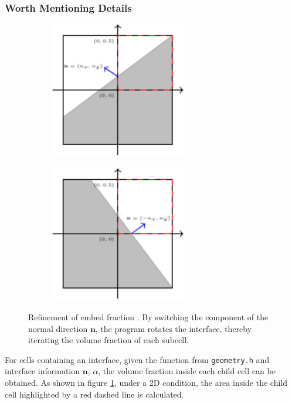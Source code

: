 \subsubsection{Worth Mentioning Details}
\begin{figure}[ht]
    \centering
    \begin{subfigure}[b]{0.45\textwidth}
        \centering
        \includegraphics[height=6cm]{./image/embed-tree-h/fraction_refine2D1.pdf}
        \subcaption{}
        \label{fig:embed-tree-2Drefine1}
    \end{subfigure}
    \begin{subfigure}[b]{0.45\textwidth}
        \centering
        \includegraphics[height=6cm]{./image/embed-tree-h/fraction_refine2D2.pdf}
        \subcaption{}
        \label{fig:embed-tree-2Drefine2}
    \end{subfigure}
    \caption{Refinement of embed fraction . By switching the component of the normal direction $\mathbf{n}$, the program rotates the interface, thereby iterating the volume fraction of each subcell.}
    \label{fig:embed-tree-2Drefine}
\end{figure}
For cells containing an interface, given the function  from \texttt{geometry.h} and interface information $\mathbf{n}$, $\alpha$, the volume fraction inside each child cell can be obtained. As shown in figure \ref{fig:embed-tree-2Drefine1}, under a 2D condition, the area inside the child cell highlighted by a red dashed line is calculated.


